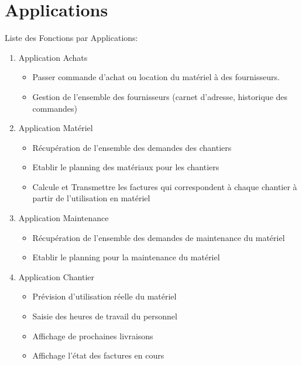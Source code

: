 \documentclass [a4paper] {report}
\begin{document}
\section{Applications}

Liste des Fonctions par Applications:

\begin{enumerate}

\item Application Achats
\begin{itemize}
\item Passer commande d'achat ou location du matériel à des fournisseurs.
\item Gestion de l'ensemble des fournisseurs (carnet d'adresse, historique des commandes)
\end{itemize}

\item Application Matériel
\begin{itemize}
\item Récupération de l'ensemble des demandes des chantiers
\item Etablir le planning des matériaux pour les chantiers
\item Calcule et Transmettre les factures qui correspondent à chaque chantier à partir de l'utilisation en matériel 
\end{itemize}

\item Application Maintenance
\begin{itemize}
\item Récupération de l'ensemble des demandes de maintenance du matériel
\item Etablir le planning pour la maintenance du matériel
\end{itemize}

\item Application Chantier
\begin{itemize}
\item Prévision d'utilisation réelle du matériel
\item Saisie des heures de travail du personnel
\item Affichage de prochaines livraisons
\item Affichage l'état des factures en cours
\end{itemize}

\end{enumerate}
\end{document}
